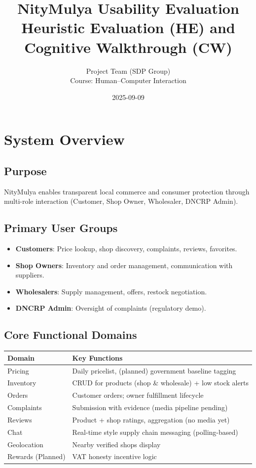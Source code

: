 \documentclass[11pt,a4paper]{article}
\title{NityMulya Usability Evaluation\\\large Heuristic Evaluation (HE) and Cognitive Walkthrough (CW)}
\author{Project Team (SDP Group)\\Course: Human--Computer Interaction}
\date{2025-09-09}
\begin{document}
\maketitle
\tableofcontents
\newpage

\section{System Overview}
\subsection{Purpose}
NityMulya enables transparent local commerce and consumer protection through multi-role interaction (Customer, Shop Owner, Wholesaler, DNCRP Admin).

\subsection{Primary User Groups}
\begin{itemize}[leftmargin=*]
  \item \textbf{Customers}: Price lookup, shop discovery, complaints, reviews, favorites.
  \item \textbf{Shop Owners}: Inventory and order management, communication with suppliers.
  \item \textbf{Wholesalers}: Supply management, offers, restock negotiation.
  \item \textbf{DNCRP Admin}: Oversight of complaints (regulatory demo).
\end{itemize}

\subsection{Core Functional Domains}
\begin{longtable}{@{}L{3cm}L{11cm}@{}}
\toprule
\textbf{Domain} & \textbf{Key Functions}\\\midrule
Pricing & Daily pricelist, (planned) government baseline tagging \\
Inventory & CRUD for products (shop \& wholesale) + low stock alerts \\
Orders & Customer orders; owner fulfillment lifecycle \\
Complaints & Submission with evidence (media pipeline pending) \\
Reviews & Product + shop ratings, aggregation (no media yet) \\
Chat & Real-time style supply chain messaging (polling-based) \\
Geolocation & Nearby verified shops display \\
Rewards (Planned) & VAT honesty incentive logic \\
\bottomrule
\end{longtable}
\end{document}
